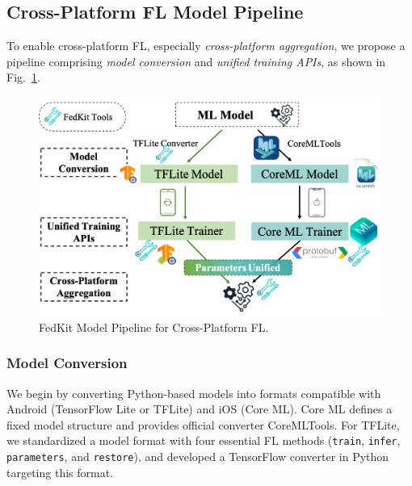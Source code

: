 \documentclass[letterpaper]{article} %
\begin{document}
\subsection{Cross-Platform FL Model Pipeline}

To enable cross-platform FL,
especially \textit{cross-platform aggregation},
we propose a pipeline comprising
\textit{model conversion} and
\textit{unified training APIs},
as shown in Fig.~\ref{cross_fl}.

\begin{figure}
    \centering
    \includegraphics*[width=\linewidth]{cross_fl_1.png}
    
    \caption{FedKit Model Pipeline for Cross-Platform FL.}
    \label{cross_fl}
\end{figure}

\subsubsection{Model Conversion}
We begin by converting Python-based models into formats compatible with
Android (TensorFlow Lite or TFLite) and iOS (Core ML).
Core ML defines a fixed model structure and provides
official converter CoreMLTools.
For TFLite, we standardized a model format with four essential FL methods
(\lstinline{train}, \lstinline{infer}, \lstinline{parameters},
and \lstinline{restore}),
and developed a TensorFlow converter in Python targeting this format.
\end{document}
